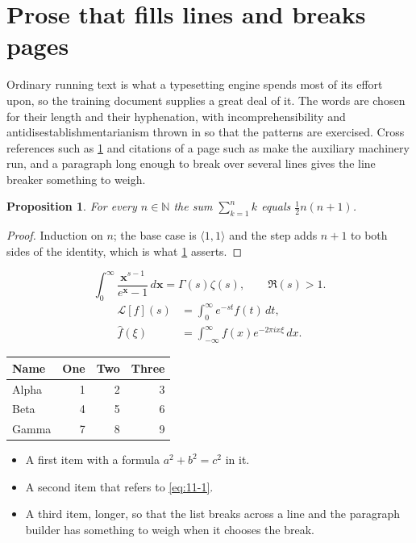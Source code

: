 \documentclass[11pt,a4paper]{report}
\theoremstyle{plain}
\newtheorem{proposition}{Proposition}[chapter]
\newcommand{\vecn}[1]{\mathbf{#1}}
\newcommand{\pairs}[2]{\langle #1,#2\rangle}
\begin{document}
\section{Prose that fills lines and breaks pages}
\label{sec:prose11-1}
Ordinary running text is what a typesetting engine spends most of its effort
upon, so the training document supplies a great deal of it. The words are
chosen for their length and their hyphenation, with incomprehensibility and
antidisestablishmentarianism thrown in so that the patterns are exercised.
Cross references such as \cref{sec:prose11-1} and citations of a page such
as \pageref{sec:prose11-1} make the auxiliary machinery run, and a
paragraph long enough to break over several lines gives the line breaker
something to weigh.
\begin{proposition}\label{prop:11-1}
For every $n\in\mathbb{N}$ the sum $\sum_{k=1}^{n}k$ equals
$\tfrac{1}{2}n(n+1)$.
\end{proposition}
\begin{proof}
Induction on $n$; the base case is $\pairs{1}{1}$ and the step adds $n+1$ to
both sides of the identity, which is what \cref{prop:11-1} asserts.
\end{proof}
\begin{equation}\label{eq:11-1}
  \int_{0}^{\infty}\frac{\vecn{x}^{s-1}}{e^{\vecn{x}}-1}\,d\vecn{x}
    = \Gamma(s)\zeta(s),\qquad \Re(s)>1 .
\end{equation}
\begin{align}
  \mathcal{L}[f](s) &= \int_{0}^{\infty} e^{-st} f(t)\,dt, \\
  \widehat{f}(\xi)  &= \int_{-\infty}^{\infty} f(x) e^{-2\pi i x\xi}\,dx .
\end{align}
\par\noindent\begin{center}
\begin{tabular}{lrrr}
\hline
Name & One & Two & Three \\
\hline
Alpha & 1 & 2 & 3 \\
Beta & 4 & 5 & 6 \\
Gamma & 7 & 8 & 9 \\
\hline
\end{tabular}
\end{center}
\begin{itemize}
  \item A first item with a formula $a^2+b^2=c^2$ in it.
  \item A second item that refers to \eqref{eq:11-1}.
  \item A third item, longer, so that the list breaks across a line and the
    paragraph builder has something to weigh when it chooses the break.
\end{itemize}
\end{document}
